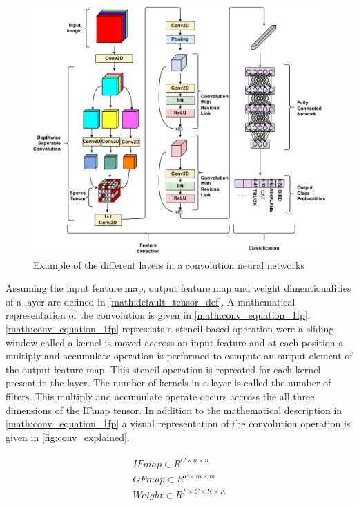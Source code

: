 \begin{figure}[ht]
    \centering
    \includegraphics[scale=0.4]{fig/cnn.pdf}
    \caption{Example of the different layers in a convolution neural networks}
    \label{fig:cnn_network}
\end{figure}


Assuming the input feature map, output feature map and weight dimentionalities
of a layer are defined in \autoref{math:default_tensor_def}. A mathematical
representation of the convolution is given in \autoref{math:conv_equation_1fp}.
\autoref{math:conv_equation_1fp} represents a stencil based operation were a
sliding window called a kernel is moved accross an input feature and at each
position a multiply and accumulate operation is performed to compute an output
element of the output feature map. This stencil operation is repreated for each
kernel present in the layer. The number of kernels in a layer is called the
number of filters. This multiply and accumulate operate occurs accross the all
three dimensions of the IFmap tensor. In addition to the mathematical
description in \autoref{math:conv_equation_1fp} a visual representation of the
convolution operation is given in \autoref{fig:conv_explained}.

\begin{align}
    \begin{split}
        IFmap \in R^{C \times n\times n} \\
        OFmap \in  R^{F \times m\times m} \\
        Weight \in R^{F \times C\times K\times K} \\
    \end{split}
    \label{math:default_tensor_def}
\end{align}

